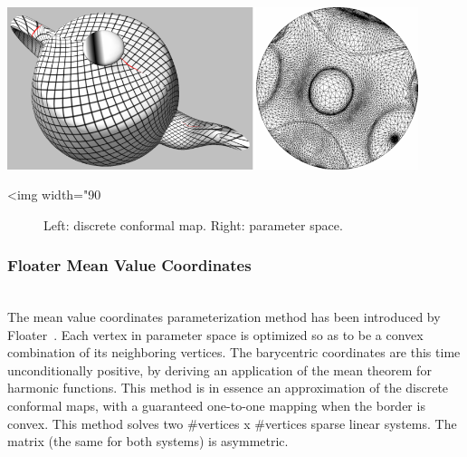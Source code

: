 \begin{center}
    \label{Surface_mesh_parameterization-fig-conformal}
    \begin{ccTexOnly}
        \includegraphics[width=0.9\textwidth]{Surface_mesh_parameterization/conformal}
    \end{ccTexOnly}
    \begin{ccHtmlOnly}
        <img width="90%
    \end{ccHtmlOnly}
    \begin{figure}[h]
        \caption{Left: discrete conformal map. Right: parameter space.}
    \end{figure}
\end{center}

\subsubsection{Floater Mean Value Coordinates}

  \\

The mean value coordinates parameterization method has been introduced
by Floater~\cite{cgal:f-mvc-03}. Each vertex in parameter space is
optimized so as to be a convex combination of its neighboring
vertices. The barycentric coordinates are this time unconditionally
positive, by deriving an application of the mean theorem for harmonic
functions. This method is in essence an approximation of the discrete conformal
maps, with a guaranteed one-to-one mapping when the border is convex.
This method solves two \#vertices x \#vertices sparse linear systems. The matrix (the
same for both systems) is asymmetric.

